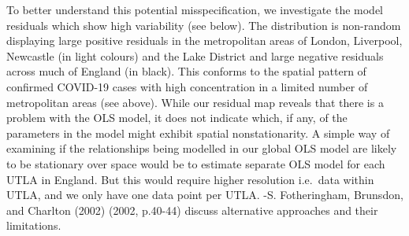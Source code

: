 \documentclass[
  letterpaper,
  DIV=11,
  numbers=noendperiod,
  oneside]{scrreprt}
\begin{document}
To better understand this potential misspecification, we investigate the
model residuals which show high variability (see below). The
distribution is non-random displaying large positive residuals in the
metropolitan areas of London, Liverpool, Newcastle (in light colours)
and the Lake District and large negative residuals across much of
England (in black). This conforms to the spatial pattern of confirmed
COVID-19 cases with high concentration in a limited number of
metropolitan areas (see above). While our residual map reveals that
there is a problem with the OLS model, it does not indicate which, if
any, of the parameters in the model might exhibit spatial
nonstationarity. A simple way of examining if the relationships being
modelled in our global OLS model are likely to be stationary over space
would be to estimate separate OLS model for each UTLA in England. But
this would require higher resolution i.e.~data within UTLA, and we only
have one data point per UTLA. -S. Fotheringham, Brunsdon, and Charlton
(2002) (2002, p.40-44) discuss alternative approaches and their
limitations.
\end{document}
